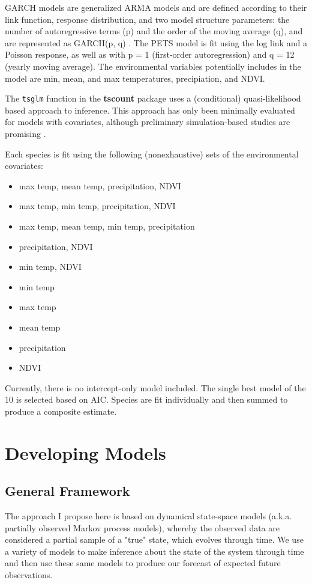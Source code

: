 \documentclass{article}
\def\code#1{\texttt{#1}}
\begin{document}
GARCH models are generalized ARMA models and are defined according to their link function, response distribution, and two model structure parameters: the number of autoregressive terms (p) and the order of the moving average (q), and are represented as GARCH(p, q) \cite{tscount}. The PETS model is fit using the log link and a Poisson response, as well as with p = 1 (first-order autoregression) and q = 12 (yearly moving average). The environmental variables potentially includes in the model are min, mean, and max temperatures, precipiation, and NDVI. 

The \code{tsglm} function in the \textbf{tscount} package \cite{tscount} uses a (conditional) quasi-likelihood based approach to inference. This approach has only been minimally evaluated for models with covariates, although preliminary simulation-based studies are promising \cite{tsglmvignette}.  

Each species is fit using the following (nonexhaustive) sets of the environmental covariates:
\begin{itemize}
\item max temp, mean temp, precipitation, NDVI
\item max temp, min temp, precipitation, NDVI
\item max temp, mean temp, min temp, precipitation
\item precipitation, NDVI
\item min temp, NDVI
\item min temp
\item max temp
\item mean temp
\item precipitation 
\item NDVI
\end{itemize}

Currently, there is no intercept-only model included. The single best model of the 10 is selected based on AIC. Species are fit individually and then summed to produce a composite estimate. 

\section{Developing Models}
\label{sec:devmods}

\subsection{General Framework}
\label{subsec:devmods_gf}

The approach I propose here is based on dynamical state-space models (a.k.a. partially observed Markov process models), whereby the observed data are considered a partial sample of a "true" state, which evolves through time. We use a variety of models to make inference about the state of the system through time and then use these same models to produce our forecast of expected future observations. 
\end{document}

